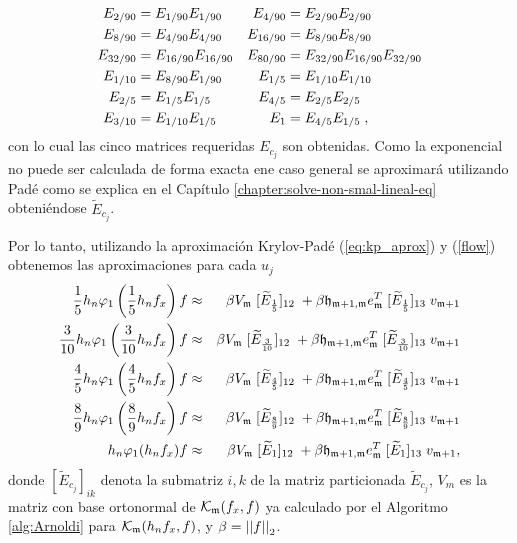 \begin{align}
    E_{2/90}& =E_{1/90}E_{1/90} & E_{4/90}& =E_{2/90}E_{2/90}  \notag \\
    E_{8/90}& =E_{4/90}E_{4/90} & E_{16/90}& =E_{8/90}E_{8/90}  \notag \\
    E_{32/90}& =E_{16/90}E_{16/90} & E_{80/90}& =E_{32/90}E_{16/90}E_{32/90}
    \label{flow} \\
    E_{1/10}& =E_{8/90}E_{1/90} & E_{1/5}& =E_{1/10}E_{1/10}  \notag \\
    E_{2/5}& =E_{1/5}E_{1/5} & E_{4/5}& =E_{2/5}E_{2/5}  \notag \\
    E_{3/10}& =E_{1/10}E_{1/5} & E_{1}& =E_{4/5}E_{1/5}\;,  \notag
\end{align}
con lo cual las cinco matrices requeridas $E_{c_j}$ son obtenidas. Como la exponencial no puede ser calculada de forma exacta ene caso general se aproximará utilizando Padé como se explica en el Capítulo \ref{chapter:solve-non-smal-lineal-eq} obteniéndose $\widetilde{E}_{c_j}$.

Por lo tanto, utilizando la aproximación Krylov-Padé (\ref{eq:kp_aprox}) y (\ref{flow}) obtenemos las aproximaciones para cada $u_j$
\begin{eqnarray}
    \frac{1}{5}h_n\varphi_1\left(\frac{1}{5}h_n f_x\right)f & \approx & \beta   V_{\mathfrak{m}}\; [\widetilde{E}_{\frac{1}{5}}]_{12}\;  + \beta \mathfrak{h}_{\mathfrak{m}+1,\mathfrak{m}}e_{\mathfrak{m}}^T\; [\widetilde{E}_{\frac{1}{5}}]_{13}\;  v_{\mathfrak{m}+1} \notag \\
    \frac{3}{10}h_n\varphi_1\left(\frac{3}{10}h_n f_x\right)f & \approx & \beta   V_{\mathfrak{m}}\; [\widetilde{E}_{\frac{3}{10}}]_{12}\;  + \beta \mathfrak{h}_{\mathfrak{m}+1,\mathfrak{m}}e_{\mathfrak{m}}^T\; [\widetilde{E}_{\frac{3}{10}}]_{13}\;  v_{\mathfrak{m}+1} \notag \\
    \frac{4}{5}h_n\varphi_1\left(\frac{4}{5}h_n f_x\right)f & \approx & \beta   V_{\mathfrak{m}}\; [\widetilde{E}_{\frac{4}{5}}]_{12}\;  + \beta \mathfrak{h}_{\mathfrak{m}+1,\mathfrak{m}}e_{\mathfrak{m}}^T\; [\widetilde{E}_{\frac{4}{5}}]_{13}\;  v_{\mathfrak{m}+1} \label{phi_appox} \\
    \frac{8}{9}h_n\varphi_1\left(\frac{8}{9}h_n f_x\right)f & \approx & \beta   V_{\mathfrak{m}}\; [\widetilde{E}_{\frac{8}{9}}]_{12}\;  + \beta \mathfrak{h}_{\mathfrak{m}+1,\mathfrak{m}}e_{\mathfrak{m}}^T\; [\widetilde{E}_{\frac{8}{9}}]_{13}\;  v_{\mathfrak{m}+1} \notag \\
    h_n\varphi_1(h_n f_x)f & \approx &  \beta V_{\mathfrak{m}}\; [\widetilde{E}_1]_{12}\;  + \beta\mathfrak{h}_{\mathfrak{m}+1,\mathfrak{m}}e_{\mathfrak{m}}^T\; [\widetilde{E}_1]_{13}\;  v_{\mathfrak{m}+1}, \notag
\end{eqnarray}
donde $[\widetilde{E}_{c_j}]_{ik}$ denota la submatriz $i,k$ de la matriz particionada $\widetilde{E}_{c_j}$, $V_m$ es la matriz con base ortonormal de $\mathcal{K}_ {\mathfrak{m}}(f_x,f)$ ya calculado por el Algoritmo \ref{alg:Arnoldi} para $\mathcal{K}_{\mathfrak{m}}(h_nf_x,f)$, y $\beta=\left\lvert \left\lvert f \right\rvert  \right\rvert_2$.

